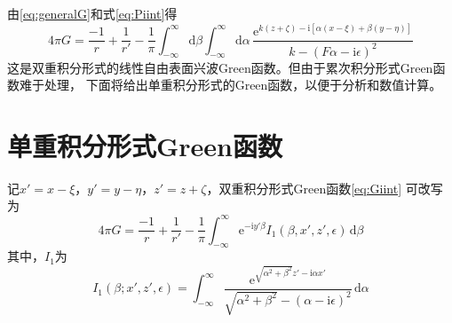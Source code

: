 由\eqref{eq:generalG}和式\eqref{eq:Piint}得
\begin{equation}
  4\pi G=\frac{-1}{r}+\frac{1}{r'}-\frac{1}{\pi}
  \int_{-\infty}^{\infty}\mathrm{d}\beta\int_{-\infty}^{\infty}\mathrm{d}\alpha\,
  \frac{\mathrm{e}^{k(z+\zeta)-\mathrm{i}[\alpha(x-\xi)+\beta(y-\eta)]}}{k-(F\alpha-\mathrm{i}\epsilon)^2}
  \label{eq:Giint}
\end{equation}
这是双重积分形式的线性自由表面兴波Green函数。但由于累次积分形式Green函数难于处理，
下面将给出单重积分形式的Green函数，以便于分析和数值计算。

\section{单重积分形式Green函数}
\label{sec:Gint}

记$x'=x-\xi$，$y'=y-\eta$，$z'=z+\zeta$，双重积分形式Green函数\eqref{eq:Giint}
可改写为
\begin{equation}
  4\pi G=\frac{-1}{r}+\frac{1}{r'}-\frac{1}{\pi}\int_{-\infty}^{\infty}
  \mathrm{e}^{-\mathrm{i}y'\beta}I_1(\beta,x',z',\epsilon)\,\mathrm{d}\beta
  \label{eq:inti1}
\end{equation}
其中，$I_1$为
\begin{equation}
  I_1(\beta;x',z',\epsilon)=\int_{-\infty}^{\infty}
  \frac{\mathrm{e}^{\sqrt{\alpha^2+\beta^2}z'-\mathrm{i}\alpha x'}}{\sqrt{\alpha^2+\beta^2}-(\alpha-\mathrm{i}\epsilon)^2}\,
  \mathrm{d}\alpha
  \label{eq:I1}
\end{equation}


